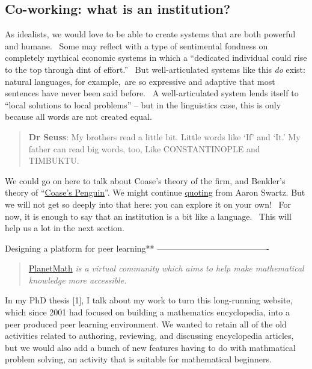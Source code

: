 \subsection{Co-working: what is an
institution?}\label{co-working-what-is-an-institution}

As idealists, we would love to be able to create systems that are both
powerful and humane.~ Some may reflect with a type of sentimental
fondness on completely mythical economic systems in which a ``dedicated
individual could rise to the top through dint of effort.''~ But
well-articulated systems like this \emph{do} exist: natural languages,
for example,~are so expressive and adaptive that most sentences have
never been said before.~ A well-articulated system lends itself to
``local solutions to local problems'' -- but in the linguistics case,
this is only because all words are not created equal.

\begin{quote}
\textbf{Dr Seuss}: My brothers read a little bit. Little words like `If'
and `It.' My father can read big words, too, Like CONSTANTINOPLE and
TIMBUKTU.
\end{quote}

We could go on here to talk about Coase's theory of the firm, and
Benkler's theory of
``\href{http://www.yale.edu/yalelj/112/BenklerWEB.pdf}{Coase's
Penguin}''. We might continue
\href{http://www.aaronsw.com/weblog/perfectinstitutions}{quoting} from
Aaron Swartz. But we will not get so deeply into that here: you can
explore it on your own!~ For now, it is enough to say that an
institution is a bit like a language.~ This will help us a lot in the
next section.

Designing a platform for peer learning**
----------------------------------------

\begin{quote}
\href{planetmath.org}{PlanetMath} \emph{is a virtual community which
aims to help make mathematical knowledge more accessible.}
\end{quote}

In my PhD thesis {{[}1{]}}, I talk about my work to turn this
long-running website, which since 2001 had focused on building a
mathematics encyclopedia, into a peer produced peer learning
environment. We wanted to retain all of the old activities related to
authoring, reviewing, and discussing encyclopedia articles, but we would
also add a bunch of new features having to do with mathmatical problem
solving, an activity that is suitable for mathematical beginners.

